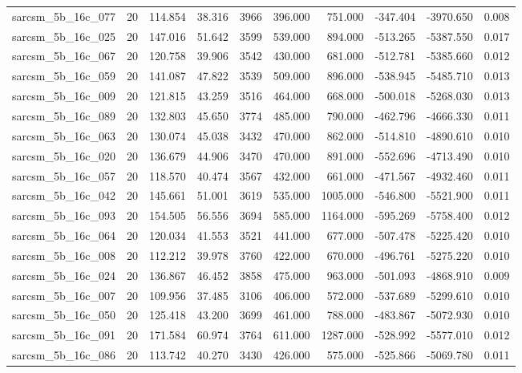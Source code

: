 \begin{tabular}{lrrrrrrrrr}
sarcsm\_5b\_16c\_077 & 20 & 114.854 & 38.316 & 3966 & 396.000 & 751.000 & -347.404 & -3970.650 & 0.008 \\
sarcsm\_5b\_16c\_025 & 20 & 147.016 & 51.642 & 3599 & 539.000 & 894.000 & -513.265 & -5387.550 & 0.017 \\
sarcsm\_5b\_16c\_067 & 20 & 120.758 & 39.906 & 3542 & 430.000 & 681.000 & -512.781 & -5385.660 & 0.012 \\
sarcsm\_5b\_16c\_059 & 20 & 141.087 & 47.822 & 3539 & 509.000 & 896.000 & -538.945 & -5485.710 & 0.013 \\
sarcsm\_5b\_16c\_009 & 20 & 121.815 & 43.259 & 3516 & 464.000 & 668.000 & -500.018 & -5268.030 & 0.013 \\
sarcsm\_5b\_16c\_089 & 20 & 132.803 & 45.650 & 3774 & 485.000 & 790.000 & -462.796 & -4666.330 & 0.011 \\
sarcsm\_5b\_16c\_063 & 20 & 130.074 & 45.038 & 3432 & 470.000 & 862.000 & -514.810 & -4890.610 & 0.010 \\
sarcsm\_5b\_16c\_020 & 20 & 136.679 & 44.906 & 3470 & 470.000 & 891.000 & -552.696 & -4713.490 & 0.010 \\
sarcsm\_5b\_16c\_057 & 20 & 118.570 & 40.474 & 3567 & 432.000 & 661.000 & -471.567 & -4932.460 & 0.011 \\
sarcsm\_5b\_16c\_042 & 20 & 145.661 & 51.001 & 3619 & 535.000 & 1005.000 & -546.800 & -5521.900 & 0.011 \\
sarcsm\_5b\_16c\_093 & 20 & 154.505 & 56.556 & 3694 & 585.000 & 1164.000 & -595.269 & -5758.400 & 0.012 \\
sarcsm\_5b\_16c\_064 & 20 & 120.034 & 41.553 & 3521 & 441.000 & 677.000 & -507.478 & -5225.420 & 0.010 \\
sarcsm\_5b\_16c\_008 & 20 & 112.212 & 39.978 & 3760 & 422.000 & 670.000 & -496.761 & -5275.220 & 0.010 \\
sarcsm\_5b\_16c\_024 & 20 & 136.867 & 46.452 & 3858 & 475.000 & 963.000 & -501.093 & -4868.910 & 0.009 \\
sarcsm\_5b\_16c\_007 & 20 & 109.956 & 37.485 & 3106 & 406.000 & 572.000 & -537.689 & -5299.610 & 0.010 \\
sarcsm\_5b\_16c\_050 & 20 & 125.418 & 43.200 & 3699 & 461.000 & 788.000 & -483.867 & -5072.930 & 0.010 \\
sarcsm\_5b\_16c\_091 & 20 & 171.584 & 60.974 & 3764 & 611.000 & 1287.000 & -528.992 & -5577.010 & 0.012 \\
sarcsm\_5b\_16c\_086 & 20 & 113.742 & 40.270 & 3430 & 426.000 & 575.000 & -525.866 & -5069.780 & 0.011 \\

\end{tabular}
